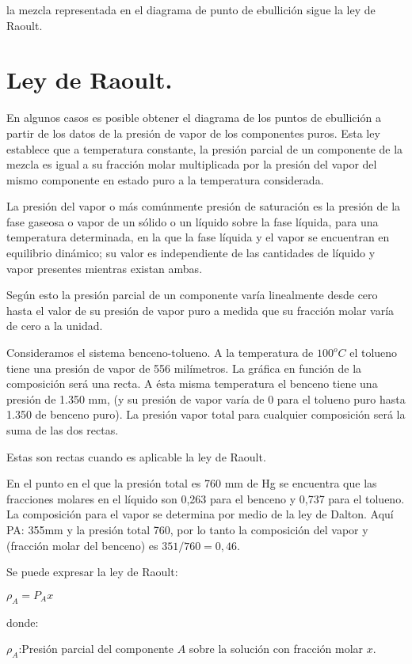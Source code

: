 \documentclass[10pt,twocolumn,openany]{book}
\begin{document}
la mezcla representada en el diagrama de punto de ebullición sigue la ley de Raoult.

\section{Ley de Raoult.}

En algunos casos es posible obtener el diagrama de los puntos de ebullición a partir de los datos de
 la presión de vapor de los componentes puros. Esta ley establece que a temperatura constante, la 
 presión parcial de un componente de la mezcla es igual a su fracción molar multiplicada por la 
 presión del vapor del mismo componente en estado puro a la temperatura considerada.

 La presión del vapor o más comúnmente presión de saturación es la presión de la fase gaseosa o 
 vapor de un sólido o un líquido sobre la fase líquida, para una temperatura determinada, en la que 
 la fase líquida y el vapor se encuentran en equilibrio dinámico; su valor es independiente de las 
 cantidades de líquido y vapor presentes mientras existan ambas.

 Según esto la presión parcial de un componente varía linealmente desde cero hasta el valor de su 
 presión de vapor puro a medida que su fracción molar varía de cero a la unidad.

 Consideramos el sistema benceno-tolueno. A la temperatura de $100^oC$ el tolueno tiene una presión 
 de vapor de 556 milímetros. La gráfica en función de la composición será una recta. A ésta misma 
 temperatura el benceno tiene una presión de 1.350 mm, (y su presión de vapor varía de 0 para el
  tolueno puro hasta 1.350 de benceno puro). La presión vapor total para cualquier composición será 
  la suma de las dos rectas.

  Estas son rectas cuando es aplicable la ley de Raoult.

  En el punto en el que la presión total es 760 mm de Hg se encuentra que las fracciones molares en 
  el líquido son 0,263 para el benceno y 0,737 para el tolueno. La composición para el vapor se 
  determina por medio de la ley de Dalton. Aquí PA: 355mm y la presión total 760, por lo tanto la 
  composición del vapor y (fracción molar del benceno) es $351/760=0,46$.

  Se puede expresar la ley de Raoult:

  $\rho_A=P_A x$

  donde:

  $\rho_A$:Presión parcial del componente $A$ sobre la solución con fracción molar $x$.
  
\end{document}
